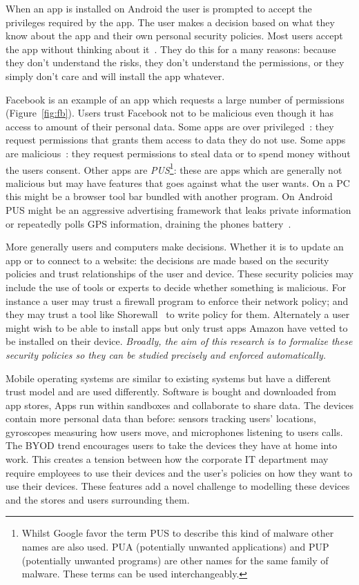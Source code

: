 \documentclass[a4paper]{article}
\begin{document}
When an app is installed on Android the user is prompted to accept the
privileges required by the app.  The user makes a decision based on what they
know about the app and their own personal security policies.  Most users accept
the app without thinking about it~\cite{Felt:2012hm}.  They do this for a many
reasons: because they don't understand the risks, they don't understand the
permissions, or they simply don't care and will install the app whatever.

Facebook is an example of an app which requests a large number of permissions
(Figure~\ref{fig:fb}). Users trust Facebook not to be malicious even though it
has access to amount of their personal data.  Some apps are over
privileged~\cite{Felt:2011kj}: they request permissions that grants them access
to data they do not use. Some apps are malicious~\cite{Zhou:2012cf}: they
request permissions to steal data or to spend money without the users consent.
Other apps are \emph{\ac{PUS}}\footnote{Whilst Google favor the term \ac{PUS} to
describe this kind of malware other names are also used. PUA (potentially
unwanted applications) and PUP (potentially unwanted programs) are other names
for the same family of malware.  These terms can be used interchangeably.}:
these are apps which are generally not malicious but may have features that goes
against what the user wants.  On a PC this might be a browser tool bar bundled
with another program.  On Android \ac{PUS} might be an aggressive advertising
framework that leaks private information or repeatedly polls GPS information,
draining the phones battery~\cite{Svajcer:2013tp}.

More generally users and computers make decisions. Whether it is to update an
app or to connect to a website: the decisions are made based on the security
policies and trust relationships of the user and device.  These security
policies may include the use of tools or experts to decide whether something is
malicious.  For instance a user may trust a firewall program to enforce their
network policy; and they may trust a tool like
{Shorewall}~\cite{Shorewall:uh,Tongaonkar:2007ua} to write
policy for them.  Alternately a user might wish to be able to install apps but
only trust apps {Amazon} have vetted to be installed on their device.
\emph{Broadly, the aim of this research is to formalize these security policies
so they can be studied precisely and enforced automatically.}

Mobile operating systems are similar to existing systems but have a
different trust model and are used differently.  Software is
bought and downloaded from app stores, Apps run within sandboxes and collaborate
to share data. The devices contain more personal data
than before: sensors tracking users' locations,  gyroscopes measuring how
users move, and microphones listening to users calls.  The \ac{BYOD} trend
encourages users to take the devices they have at home into work.
This creates a tension between how the corporate IT department may require
employees to use their devices and the user's policies on how they want to use
their devices.  These features add a novel challenge to modelling these devices
and the stores and users surrounding them.  
\end{document}

